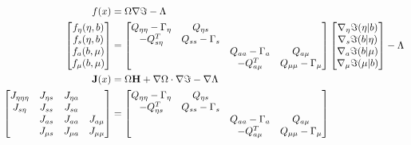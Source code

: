 \documentclass[a4paper, titlepage]{jsarticle}
\begin{document}
\begin{equation}\label{A_normal_form_for_the_flow_and_Jacobian_of_a_particular_partition}
    \begin{aligned}
        f(x) &= \Omega\nabla\imaginary - \Lambda \\
        \begin{bmatrix}
            f_{\eta}(\eta, b) \\
            f_{s}(\eta, b) \\
            f_{a}(b, \mu) \\
            f_{\mu}(b, \mu)
        \end{bmatrix}
        &=\begin{bmatrix}
            Q_{\eta\eta} - \Gamma_{\eta} & Q_{\eta s} & & \\
            -Q_{s\eta}^T & Q_{ss} - \Gamma_{s} & & \\
             & & Q_{aa} - \Gamma_{a} & Q_{a\mu} \\
             & & -Q_{a\mu}^T & Q_{\mu\mu} - \Gamma_{\mu}
        \end{bmatrix}
        \begin{bmatrix}
            \nabla_{\eta}\imaginary(\eta | b) \\
            \nabla_{s}\imaginary(b | \eta) \\
            \nabla_{a}\imaginary(b|\mu) \\
            \nabla_{\mu}\imaginary(\mu | b)
        \end{bmatrix}
        - \Lambda \\
        \mathbf{J}(x) &= \Omega\mathbf{H} + \nabla\Omega \cdot \nabla\imaginary - \nabla \Lambda \\
        \begin{bmatrix}
            J_{\eta\eta\eta} & J_{\eta s} & J_{\eta a} & \\
            J_{s\eta} & J_{ss} & J_{sa} & \\
             & J_{as} & J_{aa} & J_{a\mu} \\
             & J_{\mu s} & J_{\mu a} & J_{\mu\mu}
        \end{bmatrix}
        &= \begin{bmatrix}
            Q_{\eta\eta} - \Gamma_{\eta} & Q_{\eta s} \\
            -Q_{\eta s}^T & Q_{ss} - \Gamma_{s} \\
             & & Q_{aa} - \Gamma_{a} & Q_{a\mu} \\
             & & -Q_{a\mu}^T & Q_{\mu\mu} - \Gamma_{\mu}
        \end{bmatrix}

\end{aligned}
\end{equation}
\end{document}
